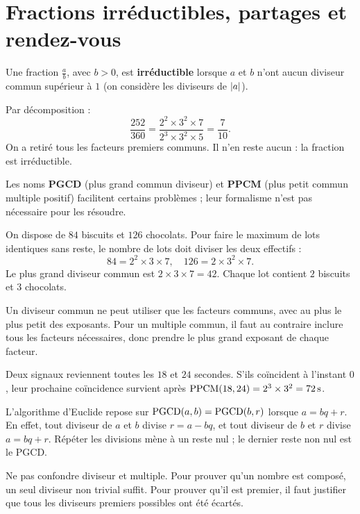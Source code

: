 \documentclass[../cours_3e.tex]{subfiles}
\begin{document}
\section{Fractions irréductibles, partages et rendez-vous}
\begin{definition}
Une fraction $\frac ab$, avec $b>0$, est \textbf{irréductible} lorsque $a$ et $b$ n'ont aucun diviseur commun supérieur à $1$ (on considère les diviseurs de $\left|a\right|$).
\end{definition}
Par décomposition :
\[\frac{252}{360}=\frac{2^2\times3^2\times7}{2^3\times3^2\times5}
=\frac7{10}.\]
On a retiré tous les facteurs premiers communs. Il n'en reste aucun : la fraction est irréductible.

\approfondissement Les noms \textbf{PGCD} (plus grand commun diviseur) et \textbf{PPCM} (plus petit commun multiple positif) facilitent certains problèmes ; leur formalisme n'est pas nécessaire pour les résoudre.
\begin{exemple}
On dispose de $84$ biscuits et $126$ chocolats. Pour faire le maximum de lots identiques sans reste, le nombre de lots doit diviser les deux effectifs :
\[84=2^2\times3\times7,\quad126=2\times3^2\times7.\]
Le plus grand diviseur commun est $2\times3\times7=42$. Chaque lot contient $2$ biscuits et $3$ chocolats.
\end{exemple}
\begin{justification}
Un diviseur commun ne peut utiliser que les facteurs communs, avec au plus le plus petit des exposants. Pour un multiple commun, il faut au contraire inclure tous les facteurs nécessaires, donc prendre le plus grand exposant de chaque facteur.
\end{justification}
\begin{exemple}
Deux signaux reviennent toutes les $18$ et $24$ secondes. S'ils coïncident à l'instant $0$, leur prochaine coïncidence survient après $\operatorname{PPCM}(18,24)=2^3\times3^2=72\,\mathrm{s}$.
\end{exemple}
\approfondissement L'algorithme d'Euclide repose sur $\operatorname{PGCD}(a,b)=\operatorname{PGCD}(b,r)$ lorsque $a=bq+r$.
En effet, tout diviseur de $a$ et $b$ divise $r=a-bq$, et tout diviseur de $b$ et $r$ divise $a=bq+r$. Répéter les divisions mène à un reste nul ; le dernier reste non nul est le PGCD.
\begin{retenir}
Ne pas confondre diviseur et multiple. Pour prouver qu'un nombre est composé, un seul diviseur non trivial suffit. Pour prouver qu'il est premier, il faut justifier que tous les diviseurs premiers possibles ont été écartés.
\end{retenir}
\end{document}
